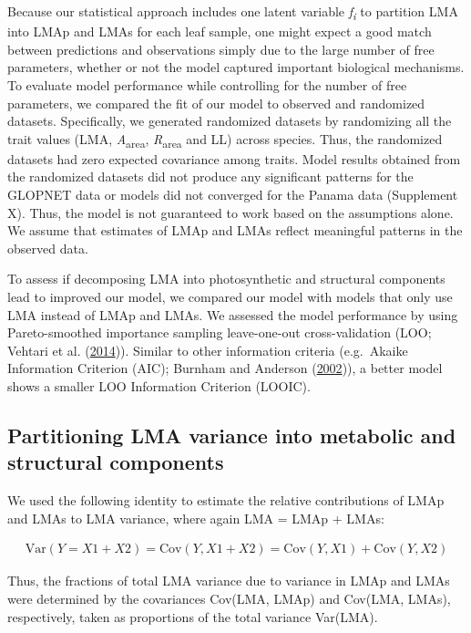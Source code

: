 \documentclass[
  12pt,
]{article}
\begin{document}
Because our statistical approach includes one latent variable \emph{f\textsubscript{i}} to partition LMA into LMAp and LMAs for each leaf sample, one might expect a good match between predictions and observations simply due to the large number of free parameters, whether or not the model captured important biological mechanisms.
To evaluate model performance while controlling for the number of free parameters, we compared the fit of our model to observed and randomized datasets.
Specifically, we generated randomized datasets by randomizing all the trait values (LMA, \emph{A}\textsubscript{area}, \emph{R}\textsubscript{area} and LL) across species.
Thus, the randomized datasets had zero expected covariance among traits.
Model results obtained from the randomized datasets did not produce any significant patterns for the GLOPNET data or models did not converged for the Panama data (Supplement X).
Thus, the model is not guaranteed to work based on the assumptions alone.
We assume that estimates of LMAp and LMAs reflect meaningful patterns in the observed data.

To assess if decomposing LMA into photosynthetic and structural components lead to improved our model, we compared our model with models that only use LMA instead of LMAp and LMAs.
We assessed the model performance by using Pareto-smoothed importance sampling leave-one-out cross-validation (LOO; Vehtari et al. (\protect\hyperlink{ref-Vehtari2014}{2014})).
Similar to other information criteria (e.g.~Akaike Information Criterion (AIC); Burnham and Anderson (\protect\hyperlink{ref-Burnham2002}{2002})), a better model shows a smaller LOO Information Criterion (LOOIC).

\hypertarget{partitioning-lma-variance-into-metabolic-and-structural-components}{%
\subsection{Partitioning LMA variance into metabolic and structural components}\label{partitioning-lma-variance-into-metabolic-and-structural-components}}

We used the following identity to estimate the relative contributions of LMAp and LMAs to LMA variance, where again LMA = LMAp + LMAs:

\begin{align}
\mathrm{Var}(Y = X1 + X2) = \mathrm{Cov}(Y, X1+X2) = \mathrm{Cov}(Y,X1) + \mathrm{Cov}(Y,X2) \label{eq:var}
\end{align}

Thus, the fractions of total LMA variance due to variance in LMAp and LMAs were determined by the covariances Cov(LMA, LMAp) and Cov(LMA, LMAs), respectively, taken as proportions of the total variance Var(LMA).
\end{document}
